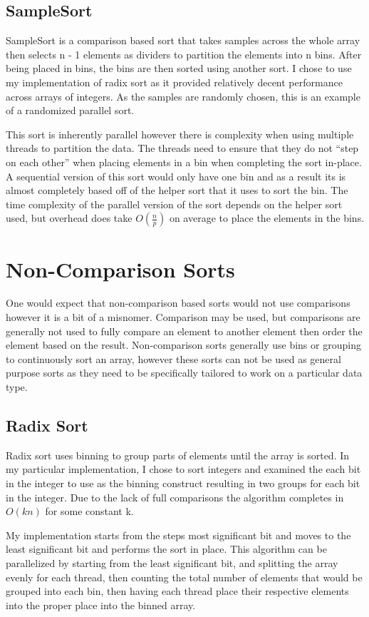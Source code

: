 \documentclass[11pt,letterpaper]{article}
\begin{document}
\subsection{SampleSort}
SampleSort is a comparison based sort that takes samples across the whole array
then selects n - 1 elements as dividers to partition the elements into n bins.
After being placed in bins, the bins are then sorted using another sort.  I
chose to use my implementation of radix sort as it provided relatively decent
performance across arrays of integers. As the samples are randomly chosen, this
is an example of a randomized parallel sort.
\par
This sort is inherently parallel however there is complexity when using multiple
threads to partition the data.  The threads need to ensure that they do not
“step on each other” when placing elements in a bin when completing the sort
in-place.  A sequential version of this sort would only have one bin and as a
result its is almost completely based off of the helper sort that it uses to
sort the bin. The time complexity of the parallel version of the sort depends on
the helper sort used, but overhead does take $O(\frac{n}{p})$ on average to
place the elements in the bins.   

\section{Non-Comparison Sorts}
One would expect that non-comparison based sorts would not use comparisons
however it is a bit of a misnomer.  Comparison may be used, but comparisons are
generally not used to fully compare an element to another element then order the
element based on the result.  Non-comparison sorts generally use bins or
grouping to continuously sort an array, however these sorts can not be used as
general purpose sorts as they need to be specifically tailored to work on a
particular data type. 
\subsection{Radix Sort} 
Radix sort uses binning to group parts of elements until the array is sorted.
In my particular implementation, I chose to sort integers and examined the each
bit in the integer to use as the binning construct resulting in two groups for
each bit in the integer.  Due to the lack of full comparisons the algorithm
completes in $O(kn)$ for some constant k.
\par
My implementation starts from the steps most significant bit and moves to the
least significant bit and performs the sort in place.  This algorithm can be
parallelized by starting from the least significant bit, and splitting the array
evenly for each thread, then counting the total number of elements that would be
grouped into each bin, then having each thread place their respective elements
into the proper place into the binned array. 
\end{document}

